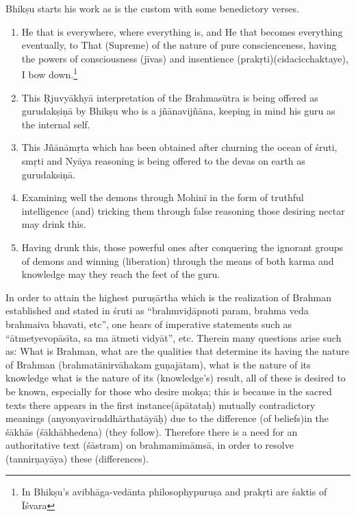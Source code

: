 Bhikṣu starts his work as is the custom with some benedictory verses.
\begin{enumerate}
\item He that is everywhere, where everything is, and He that becomes everything eventually, to That (Supreme) of the nature of pure conscienceness, having the powers of consciousness  (jīvas) and insentience (prakṛti)(cidacicchaktaye), I bow down.\footnote{In Bhikṣu's avibhāga-vedānta  philosophypuruṣa and prakṛti are śaktis of Īśvara}

\item This Ṛjuvyākhyā interpretation of the Brahmasūtra is being offered as gurudakṣiṇā  by Bhikṣu who is a jñānavijñāna, keeping in mind his guru as the internal self.
          
\item This Jñānāmṛta which has been obtained after churning the ocean of śruti, smṛti and Nyāya reasoning is being offered to the devas on earth as gurudaksiṇā.

\item Examining well the demons through Mohinī in the form of truthful intelligence (and) tricking them through false reasoning those desiring nectar may drink this.

\item Having drunk this, those powerful ones after conquering the ignorant groups of demons and winning (liberation) through the means of both karma and knowledge may they reach the feet of the guru.
\end{enumerate}


In order to attain the highest puruṣārtha which is the realization of Brahman established and stated in śruti as ``brahmviḍāpnoti param, brahma veda brahmaiva bhavati, etc'', one hears of imperative statements such as ``ātmetyevopā\-sīta, sa ma ātmeti vidyāt'', etc. Therein many questions arise such as: What is Brahman, what are the qualities that  determine its having the nature of Brahman (brahmatā\-nirvā\-hakam guṇajātam), what is the nature of its knowledge what is the nature of its (knowledge's) result, all of these is desired to be known, especially for those who desire mokṣa; this is because in the sacred texts there appears in the first instance(āpātataḥ) mutually contradictory meanings (anyonyaviruddhārthatāyāḥ) due to the difference (of beliefs)in the śākhās (śākhābhedena) (they follow). Therefore there is a need for an authoritative text (śāstram) on brahmamīmāmsā, in order to resolve (tannirṇayāya) these (differences).

